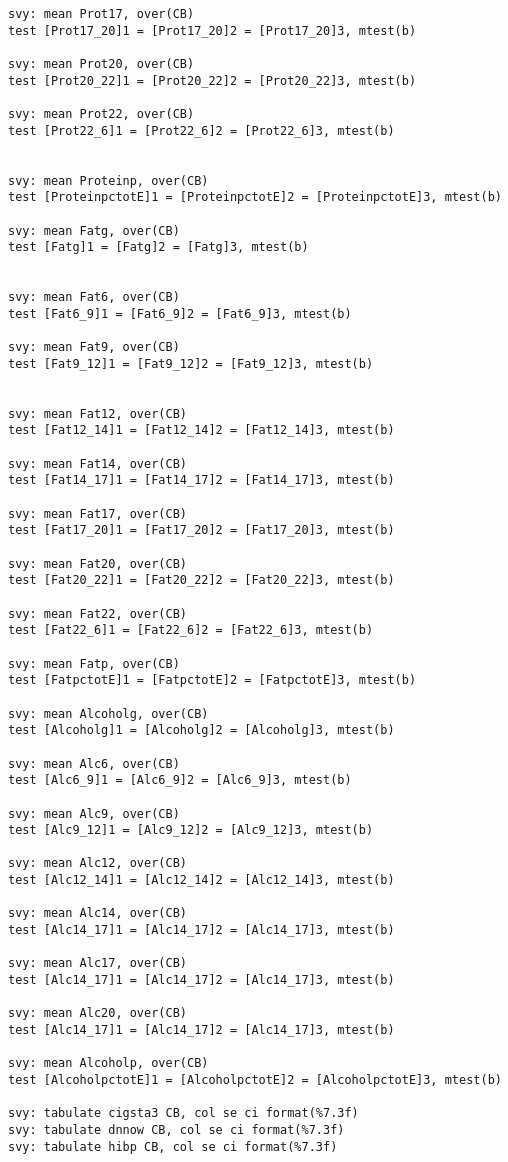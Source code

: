 \begin{verbatim}
svy: mean Prot17, over(CB)
test [Prot17_20]1 = [Prot17_20]2 = [Prot17_20]3, mtest(b) 

svy: mean Prot20, over(CB)
test [Prot20_22]1 = [Prot20_22]2 = [Prot20_22]3, mtest(b) 

svy: mean Prot22, over(CB)
test [Prot22_6]1 = [Prot22_6]2 = [Prot22_6]3, mtest(b) 


svy: mean Proteinp, over(CB)
test [ProteinpctotE]1 = [ProteinpctotE]2 = [ProteinpctotE]3, mtest(b) 

svy: mean Fatg, over(CB)
test [Fatg]1 = [Fatg]2 = [Fatg]3, mtest(b) 


svy: mean Fat6, over(CB)
test [Fat6_9]1 = [Fat6_9]2 = [Fat6_9]3, mtest(b) 

svy: mean Fat9, over(CB)
test [Fat9_12]1 = [Fat9_12]2 = [Fat9_12]3, mtest(b) 


svy: mean Fat12, over(CB)
test [Fat12_14]1 = [Fat12_14]2 = [Fat12_14]3, mtest(b) 

svy: mean Fat14, over(CB)
test [Fat14_17]1 = [Fat14_17]2 = [Fat14_17]3, mtest(b) 

svy: mean Fat17, over(CB)
test [Fat17_20]1 = [Fat17_20]2 = [Fat17_20]3, mtest(b) 

svy: mean Fat20, over(CB)
test [Fat20_22]1 = [Fat20_22]2 = [Fat20_22]3, mtest(b) 

svy: mean Fat22, over(CB)
test [Fat22_6]1 = [Fat22_6]2 = [Fat22_6]3, mtest(b) 

svy: mean Fatp, over(CB)
test [FatpctotE]1 = [FatpctotE]2 = [FatpctotE]3, mtest(b) 

svy: mean Alcoholg, over(CB)
test [Alcoholg]1 = [Alcoholg]2 = [Alcoholg]3, mtest(b) 

svy: mean Alc6, over(CB)
test [Alc6_9]1 = [Alc6_9]2 = [Alc6_9]3, mtest(b) 

svy: mean Alc9, over(CB)
test [Alc9_12]1 = [Alc9_12]2 = [Alc9_12]3, mtest(b) 

svy: mean Alc12, over(CB)
test [Alc12_14]1 = [Alc12_14]2 = [Alc12_14]3, mtest(b) 

svy: mean Alc14, over(CB)
test [Alc14_17]1 = [Alc14_17]2 = [Alc14_17]3, mtest(b) 

svy: mean Alc17, over(CB)
test [Alc14_17]1 = [Alc14_17]2 = [Alc14_17]3, mtest(b) 

svy: mean Alc20, over(CB)
test [Alc14_17]1 = [Alc14_17]2 = [Alc14_17]3, mtest(b) 

svy: mean Alcoholp, over(CB)
test [AlcoholpctotE]1 = [AlcoholpctotE]2 = [AlcoholpctotE]3, mtest(b) 

svy: tabulate cigsta3 CB, col se ci format(%7.3f)
svy: tabulate dnnow CB, col se ci format(%7.3f)
svy: tabulate hibp CB, col se ci format(%7.3f)


\end{verbatim}
